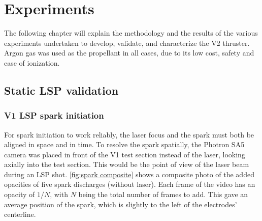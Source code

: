 \chapter{Experiments}

    The following chapter will explain the methodology and the results of the various experiments undertaken to develop, validate, and characterize the V2 thruster. Argon gas was used as the propellant in all cases, due to its low cost, safety and ease of ionization.

    \section{Static LSP validation}

        \subsection{V1 LSP spark initiation}

            For spark initiation to work reliably, the laser focus and the spark must both be aligned in space and in time. To resolve the spark spatially, the Photron SA5 camera was placed in front of the V1 test section instead of the laser, looking axially into the test section. This would be the point of view of the laser beam during an LSP shot. \autoref{fig:spark composite} shows a composite photo of the added opacities of five spark discharges (without laser). Each frame of the video has an opacity of $1/N$, with $N$ being the total number of frames to add. This gave an average position of the spark, which is slightly to the left of the electrodes' centerline.


